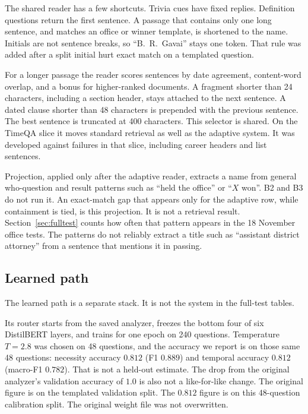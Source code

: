 \documentclass[11pt,letterpaper]{article}
\begin{document}
The shared reader has a few shortcuts.
Trivia cues have fixed replies.
Definition questions return the first sentence.
A passage that contains only one long sentence, and matches an office or winner template, is shortened to the name.
Initials are not sentence breaks, so ``B.\ R.\ Gavai'' stays one token.
That rule was added after a split initial hurt exact match on a templated question.

For a longer passage the reader scores sentences by date agreement, content-word overlap, and a bonus for higher-ranked documents.
A fragment shorter than 24 characters, including a section header, stays attached to the next sentence.
A dated clause shorter than 48 characters is prepended with the previous sentence.
The best sentence is truncated at 400 characters.
This selector is shared.
On the TimeQA slice it moves standard retrieval as well as the adaptive system.
It was developed against failures in that slice, including career headers and list sentences.

Projection, applied only after the adaptive reader, extracts a name from general who-question and result patterns such as ``held the office'' or ``$X$ won''.
B2 and B3 do not run it.
An exact-match gap that appears only for the adaptive row, while containment is tied, is this projection.
It is not a retrieval result.
Section~\ref{sec:fulltest} counts how often that pattern appears in the 18 November office tests.
The patterns do not reliably extract a title such as ``assistant district attorney'' from a sentence that mentions it in passing.

\subsection{Learned path}
\label{sec:learned}

The learned path is a separate stack.
It is not the system in the full-test tables.

Its router starts from the saved analyzer, freezes the bottom four of six DistilBERT layers, and trains for one epoch on 240 questions.
Temperature $T=2.8$ was chosen on 48 questions, and the accuracy we report is on those same 48 questions: necessity accuracy $0.812$ (F1 $0.889$) and temporal accuracy $0.812$ (macro-F1 $0.782$).
That is not a held-out estimate.
The drop from the original analyzer's validation accuracy of $1.0$ is also not a like-for-like change.
The original figure is on the templated validation split.
The $0.812$ figure is on this 48-question calibration split.
The original weight file was not overwritten.
\end{document}
